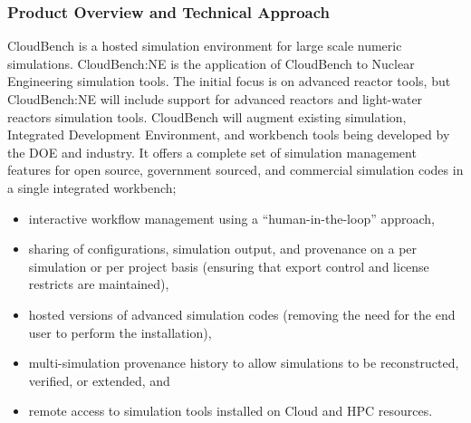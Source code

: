
\subsubsection{Product Overview and Technical Approach}

CloudBench is a hosted simulation environment for large scale numeric
simulations. CloudBench:NE is the application of CloudBench to Nuclear
Engineering simulation tools. The initial focus is on advanced reactor
tools, but CloudBench:NE will include support for advanced reactors
and light-water reactors simulation tools. CloudBench will augment
existing simulation, Integrated Development Environment, and workbench
tools being developed by the DOE and industry. It offers a complete
set of simulation management features for open source, government
sourced, and commercial simulation codes in a single integrated
workbench;

\begin{itemize}
\item interactive workflow management using a ``human-in-the-loop'' approach,
\item sharing of configurations, simulation output, and provenance on
  a per simulation or per project basis (ensuring that export control
  and license restricts are maintained),
\item hosted versions of advanced simulation codes (removing the need
  for the end user to perform the installation),
\item multi-simulation provenance history to allow simulations to be
  reconstructed, verified, or extended, and
\item remote access to simulation tools installed on Cloud and HPC
  resources.
\end{itemize}

